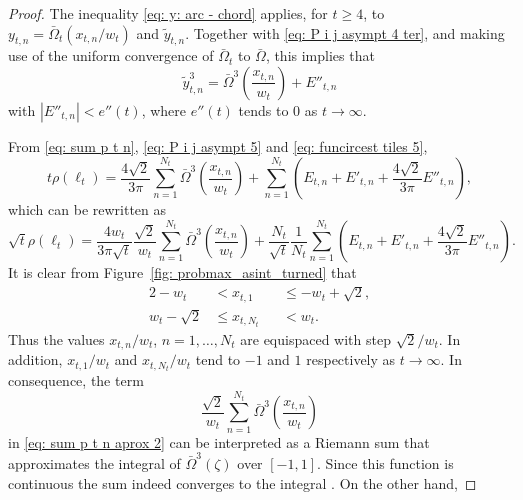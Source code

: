 \documentclass[12pt, a4paper]{article}
\newcommand{\probmax}{\rho} %
\newcommand{\len}{\ell} %
\newcommand{\tiles}{t} %
\newcommand{\funcircesc}{\bar \Omega}
\begin{document}
\begin{proof}
The inequality \eqref{eq: y: arc - chord} applies, for $\tiles \geq 4$, to $y_{\tiles,n} = \funcircesc_\tiles(x_{\tiles,n}/w_\tiles)$ and $\tilde y_{\tiles,n}$. Together with \eqref{eq: P i j asympt 4 ter}, and making use of the uniform convergence of $\funcircesc_\tiles$ to $\funcircesc$, 
this implies that
\begin{equation}
\label{eq: funcircest tiles 5}
\tilde y_{\tiles,n}^3 = \funcircesc^3\left( \frac{x_{\tiles,n}} {w_\tiles} \right) + E''_{\tiles,n}
\end{equation}
with $|E''_{\tiles,n}| < e''(t)$, where $e''(\tiles)$ tends to $0$ as $\tiles \rightarrow \infty$.

From \eqref{eq: sum p t n}, \eqref{eq: P i j asympt 5} and \eqref{eq: funcircest tiles 5},
\begin{equation}
\label{eq: sum p t n aprox 1}
\tiles \probmax(\len_\tiles) = \frac{4 \sqrt{2}} {3\pi} \sum_{n=1}^{N_\tiles} \funcircesc^3 \left( \frac{x_{\tiles,n}}{w_\tiles} \right) + \sum_{n=1}^{N_\tiles} \left(E_{\tiles,n} + E'_{\tiles,n} + \frac{4 \sqrt{2}} {3\pi} E''_{\tiles,n} \right),
\end{equation}
which can be rewritten as
\begin{equation}
\label{eq: sum p t n aprox 2}
\sqrt{\tiles} \probmax(\len_\tiles) = \frac{4 w_\tiles} {3\pi\sqrt{\tiles}} \frac {\sqrt{2}} {w_\tiles} \sum_{n=1}^{N_\tiles} \funcircesc^3 \left( \frac{x_{\tiles,n}}{w_\tiles} \right)
+ \frac{{N_\tiles}} {\sqrt{t}} \frac 1 {N_\tiles} \sum_{n=1}^{N_\tiles} \left(E_{\tiles,n} + E'_{\tiles,n} + \frac{4 \sqrt{2}} {3\pi} E''_{\tiles,n} \right).
\end{equation}
It is clear from Figure~\ref{fig: probmax_asint_turned} that
\begin{alignat}{2}
-w_\tiles &< x_{\tiles,1} && \leq -w_\tiles + \sqrt{2}, \\
w_\tiles - \sqrt{2} &\leq x_{\tiles,N_\tiles} && < w_\tiles.
\end{alignat}
Thus the values $x_{\tiles,n}/w_\tiles$, $n=1,\ldots,N_\tiles$ are equispaced with step $\sqrt{2}/w_\tiles$. In addition, $x_{\tiles,1} / w_\tiles$ and $x_{\tiles,N_\tiles} / w_\tiles$ tend to $-1$ and $1$  respectively as $\tiles \rightarrow \infty$. In consequence, the term
\[
\frac{\sqrt{2}}{w_\tiles} \sum_{n=1}^{N_\tiles} \funcircesc^3 \left( \frac{x_{\tiles,n}}{w_\tiles} \right)
\]
in \eqref{eq: sum p t n aprox 2} can be interpreted as a Riemann sum that approximates the integral of $\funcircesc^3(\zeta)$ over $[-1,1]$. Since this function is continuous the sum indeed converges to the integral \cite[section~7.2]{Abbott15}. On the other hand,

\end{proof}
\end{document}
